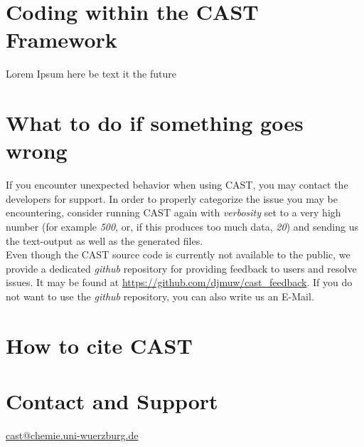 \documentclass[10pt,a4paper]{article} %
\newif\ifdevmode %
\begin{document}
	\section{Coding within the CAST Framework}
	Lorem Ipsum here be text it the future \\
	\ifdevmode \colorbox{red}{Once CAST4 is up and running we should pt some information on the code here.} \fi
	\fi


	\newpage
	\section{What to do if something goes wrong}
	If you encounter unexpected behavior when using \ac{CAST}, you may contact the developers for support. In order to properly categorize the issue you may be encountering, consider running \ac{CAST} again with \textit{verbosity} set to a very high number (for example \textit{500}, or, if this produces too much data, \textit{20}) and sending us the text-output as well as the generated files. \\

	Even though the \ac{CAST} source code is currently not available to the public, we provide a dedicated \textit{github} repository for providing feedback to users and resolve issues. It may be found at \url{https://github.com/djmuw/cast_feedback}. If you do not want to use the \textit{github} repository, you can also write us an E-Mail.

	\newpage
	\section{How to cite CAST}

	\newpage
	\section{Contact and Support}
	\href{mailto:cast@chemie.uni-wuerzburg.de}{cast@chemie.uni-wuerzburg.de} \ifdevmode \colorbox{red}{we should really acquire this mail adress, better than not having it.} \fi \\~\\
\end{document}
